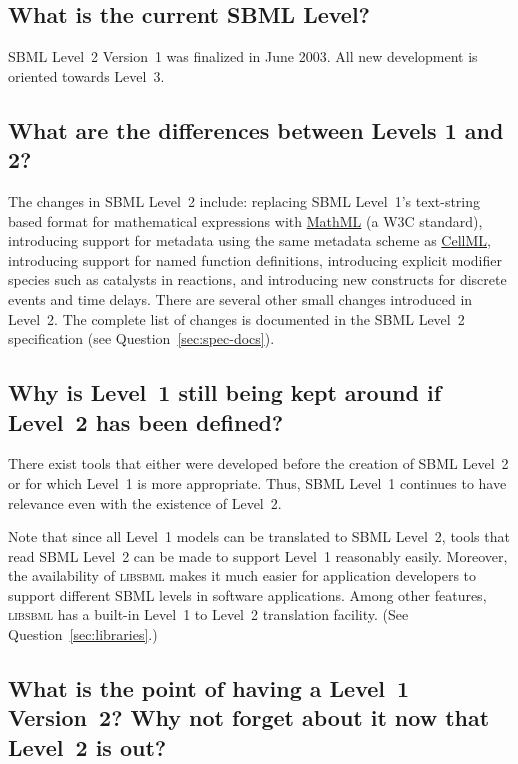 \documentclass{sbmlfaq}
\begin{document}
\subsection{What is the current SBML Level?}

SBML Level~2 Version~1 was finalized in June 2003.  All new development is
oriented towards Level~3.


\subsection{What are the differences between Levels 1 and 2?}

The changes in SBML Level~2 include: replacing SBML Level~1's text-string
based format for mathematical expressions with
\href{http://www.w3.org/TR/2003/WD-MathML2-20030411/}{MathML} (a W3C
standard), introducing support for metadata using the same metadata scheme
as \href{http://www.cellml.org}{CellML}, introducing support for named
function definitions, introducing explicit modifier species such as
catalysts in reactions, and introducing new constructs for discrete events
and time delays.  There are several other small changes introduced in
Level~2.  The complete list of changes is documented in the SBML Level~2
specification (see Question~\ref{sec:spec-docs}).


\subsection{Why is Level~1 still being kept around if Level~2 has been defined?}
\label{sec:why-keep-level-1}

There exist tools that either were developed before the creation of SBML
Level~2 or for which Level~1 is more appropriate.  Thus, SBML Level~1
continues to have relevance even with the existence of Level~2.  

Note that since all Level~1 models can be translated to SBML Level~2, tools
that read SBML Level~2 can be made to support Level~1 reasonably easily.
Moreover, the availability of \textsc{libsbml} makes it much easier for
application developers to support different SBML levels in software
applications.  Among other features, \textsc{libsbml} has a built-in
Level~1 to Level~2 translation facility.  (See
Question~\ref{sec:libraries}.)


\subsection{What is the point of having a Level~1 Version~2?  Why not
  forget about it now that Level~2 is out?}
\end{document}
